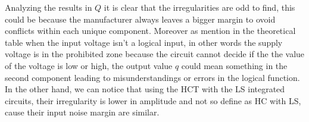 	\pagebreak

	Analyzing the results in $Q$ it is clear that the irregularities are odd to find, this could be because the manufacturer always leaves a bigger margin to ovoid conflicts within each unique component. Moreover as mention in the theoretical table when the input voltage isn't a logical input, in other words the supply voltage is in the prohibited zone because the circuit cannot decide if the the value of the voltage is low or high, the output value $q$ could mean something in the second component leading to misunderstandings or errors in the logical function. In the other hand, we can notice that using the HCT with the LS integrated circuits, their irregularity is lower in amplitude and not so define as HC with LS, cause their input noise margin are similar. 

